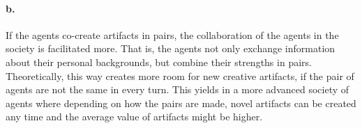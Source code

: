 \documentclass[english]{tktltiki}
\begin{document}
    \paragraph{b.} If the agents co-create artifacts in pairs, the collaboration of the agents in the society is facilitated more. That is, the agents not only exchange information about their personal backgrounds, but combine their strengths in pairs. Theoretically, this way creates more room for new creative artifacts, if the pair of agents are not the same in every turn. This yields in a more advanced society of agents where depending on how the pairs are made, novel artifacts can be created any time and the average value of artifacts might be higher. 
    
    
\end{document}

